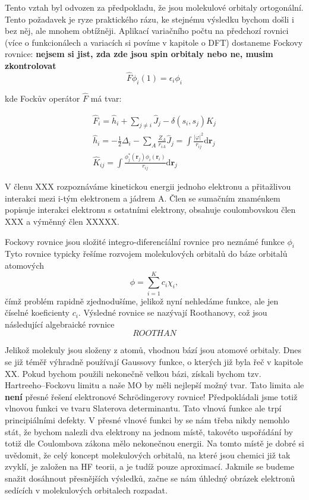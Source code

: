 Tento vztah byl odvozen za předpokladu, že jsou molekulové orbitaly ortogonální. Tento požadavek je ryze praktického rázu, ke stejnému výsledku bychom došli i bez něj, ale mnohem obtížněji. Aplikací variačního počtu na předchozí rovnici (více o funkcionálech a variacích si povíme v kapitole o DFT) dostaneme Fockovy rovnice: \textbf{nejsem si jist, zda zde jsou spin orbitaly nebo ne, musim zkontrolovat}
\begin{equation}
\hat{F}\phi_i(1) = \epsilon_i \phi_i   
\end{equation}

kde Fockův operátor $\hat{F}$ má tvar:

\begin{eqnarray}
\hat{F}_i = \hat{h}_i+\sum_{j\neq i} \hat{J}_j - \delta(s_i,s_j) \hat{K}_j \\
\hat{h}_i = -\frac{1}{2}\Delta_i - \sum_{A}\frac{Z_A}{r_{iA}}
\hat{J}_j=\int \frac{|\varphi |^2}{r_{ij}}\mathrm{d}\textbf{r}_j \\
\hat{K}_{ij} = \int \frac{\phi_j^*(\mathbf{r}_j)\phi_i(\mathbf{r}_i)}{r_{ij}}\mathrm{d}\textbf{r}_j
\end{eqnarray}

V členu XXX rozpoznáváme kinetickou energii jednoho elektronu a přitažlivou interakci mezi i-tým elektronem a jádrem A. Člen se sumačním znaménkem popisuje interakci elektronu s ostatními elektrony, obsahuje coulombovskou člen XXX a výměnný člen XXXXX.


Fockovy rovnice jsou složité integro-diferencíální rovnice pro neznámé funkce $\phi_i$
Tyto rovnice typicky řešíme rozvojem molekulových orbitalů do báze orbitalů atomových
\begin{equation}
\phi=\sum_{i=1}^K c_i \chi_i ,
\end{equation}
čímž problém rapidně zjednodušíme, jelikož nyní nehledáme funkce, ale jen číselné koeficienty $c_i$.
Výsledné rovnice se nazývají Roothanovy, což jsou následující algebraické rovnice
\begin{equation}
ROOTHAN
\end{equation}


Jelikož molekuly jsou složeny z atomů, vhodnou bází jsou atomové orbitaly.
Dnes se již téměř výhradně používají Gaussovy funkce, o kterých již byla řeč v kapitole XX.
Pokud bychom použili nekonečně velkou bázi, získali bychom tzv. Hartreeho--Fockovu limitu a naše MO by měli nejlepší možný tvar. Tato limita ale \textbf{není} přesné řešení elektronové Schr\"{o}dingerovy rovnice!
Předpokládali jsme totiž vlnovou funkci ve tvaru Slaterova determinantu. Tato vlnová funkce ale trpí principiálními defekty. V přesné vlnové funkci by se nám třeba nikdy nemohlo stát, že bychom nalezli dva elektrony na jednom místě, takovéto uspořádání by totiž dle Coulombova zákona mělo nekonečnou energii.
Na tomto místě je dobré si uvědomit, že celý koncept molekulových orbitalů, na které jsou chemici již tak zvyklí, je založen na HF teorii, a je tudíž pouze aproximací. Jakmile se budeme snažit dosáhnout přesnějších výsledků, začne se nám úhledný obrázek elektronů sedících v molekulových orbitalech rozpadat.

